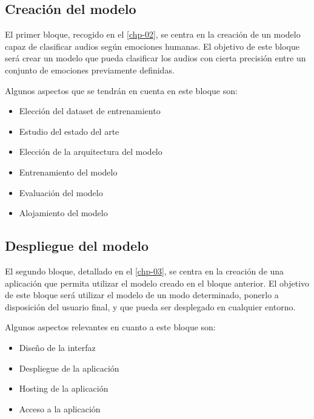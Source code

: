 \medskip

\subsection{Creación del modelo}\label{sec:diseno-modelo}

El primer bloque, recogido en el \autoref{chp-02}, se centra en la creación de un modelo capaz de clasificar audios según emociones humanas.
El objetivo de este bloque será crear un modelo que pueda clasificar los audios con cierta precisión entre un conjunto de emociones previamente definidas.

Algunos aspectos que se tendrán en cuenta en este bloque son:
\begin{itemize}\itemsep1pt \parskip0pt 
    \item Elección del dataset de entrenamiento
    \item Estudio del estado del arte
    \item Elección de la arquitectura del modelo
    \item Entrenamiento del modelo
    \item Evaluación del modelo
    \item Alojamiento del modelo
\end{itemize}

\medskip


\subsection{Despliegue del modelo}\label{sec:diseno-despliegue}

El segundo bloque, detallado en el \autoref{chp-03}, se centra en la creación de una aplicación que permita utilizar el modelo creado en el bloque anterior.
El objetivo de este bloque será utilizar el modelo de un modo determinado, ponerlo a disposición del usuario final, y que pueda ser desplegado en cualquier entorno.

Algunos aspectos relevantes en cuanto a este bloque son:

\begin{itemize}\itemsep1pt \parskip0pt 
    \item Diseño de la interfaz
    \item Despliegue de la aplicación
    \item Hosting de la aplicación
    \item Acceso a la aplicación
\end{itemize}



\endinput

